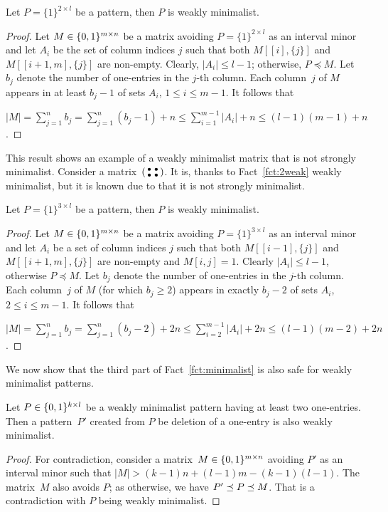 \begin{fct}
\label{fct:2weak}
Let $P=\{1\}^{2\times l}$ be a pattern, then $P$ is weakly minimalist.
\end{fct}
\begin{proof}
Let $M\in\{0,1\}^{m\times n}$ be a matrix avoiding $P=\{1\}^{2\times l}$ as an interval minor and let $A_i$ be the set of column indices $j$ such that both $M[[i],\{j\}]$ and $M[[i+1,m],\{j\}]$ are non-empty. Clearly, $|A_i|\leq l-1$; otherwise, $P\preceq M$. Let $b_j$ denote the number of one-entries in the $j$-th column. Each column~$j$ of $M$ appears in at least $b_j-1$ of sets $A_i$, $1\leq i\leq m-1$. It follows that

$|M|=\sum\limits_{j=1}^nb_j=\sum\limits_{j=1}^n(b_j-1)+n\leq\sum\limits_{i=1}^{m-1}|A_i|+n\leq(l-1)(m-1)+n$.
\end{proof}

This result shows an example of a weakly minimalist matrix that is not strongly minimalist. Consider a matrix~$\left(\begin{smallmatrix}\bullet&\bullet\\\bullet&\bullet\end{smallmatrix}\right)$. It is, thanks to Fact~\ref{fct:2weak} weakly minimalist, but it is known due to \cite{p33} that it is not strongly minimalist.

\begin{fct}
\label{fct:3weak}
Let $P=\{1\}^{3\times l}$ be a pattern, then $P$ is weakly minimalist.
\end{fct}
\begin{proof}
Let $M\in\{0,1\}^{m\times n}$ be a matrix avoiding $P=\{1\}^{3\times l}$ as an interval minor and let $A_i$ be a set of column indices $j$ such that both $M[[i-1],\{j\}]$ and $M[[i+1,m],\{j\}]$ are non-empty and $M[i,j]=1$. Clearly $|A_i|\leq l-1$, otherwise $P\preceq M$. Let $b_j$ denote the number of one-entries in the $j$-th column. Each column~$j$ of $M$ (for which $b_j\geq2$) appears in exactly $b_j-2$ of sets $A_i$, $2\leq i\leq m-1$. It follows that

$|M|=\sum\limits_{j=1}^nb_j=\sum\limits_{j=1}^n(b_j-2)+2n\leq\sum\limits_{i=2}^{m-1}|A_i|+2n\leq(l-1)(m-2)+2n$.
\end{proof}

We now show that the third part of Fact~\ref{fct:minimalist} is also safe for weakly minimalist patterns.

\begin{lemma}
Let $P\in\{0,1\}^{k\times l}$ be a weakly minimalist pattern having at least two one-entries. Then a pattern~$P'$ created from $P$ be deletion of a one-entry is also weakly minimalist.
\end{lemma}
\begin{proof}
For contradiction, consider a matrix~$M\in\{0,1\}^{m\times n}$ avoiding $P'$ as an interval minor such that $|M|>(k-1)n+(l-1)m-(k-1)(l-1)$. The matrix~$M$ also avoids $P$; as otherwise, we have $P'\preceq P\preceq M$. That is a contradiction with $P$ being weakly minimalist. 
\end{proof}

